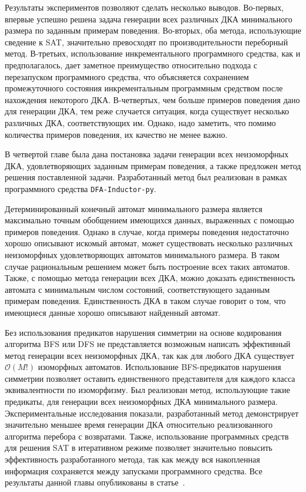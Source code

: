 Результаты экспериментов позволяют сделать несколько выводов.
Во-первых, впервые успешно решена задача генерации всех различных ДКА минимального размера по заданным примерам поведения.
Во-вторых, оба метода, использующие сведение к SAT, значительно превосходят по производительности переборный метод.
В-третьих, использование инкрементального программного средства, как и предполагалось, дает заметное преимущество относительно подхода с перезапуском программного средства, что объясняется сохранением промежуточного состояния инкрементальным программным средством после нахождения некоторого ДКА.
В-четвертых, чем больше примеров поведения дано для генерации ДКА, тем реже случается ситуация, когда существует несколько различных ДКА, соответствующих им.
Однако, надо заметить, что помимо количества примеров поведения, их качество не менее важно.



\chresults{\ref{sec:findall}}

В четвертой главе была дана постановка задачи генерации всех неизоморфных ДКА, удовлетворяющих заданным примерам поведения, а также предложен метод решения поставленной задачи.
Разработанный метод был реализован в рамках программного средства \texttt{DFA-Inductor-py}.

Детерминированный конечный автомат минимального размера является максимально точным обобщением имеющихся данных, выраженных с помощью примеров поведения.
Однако в случае, когда примеры поведения недостаточно хорошо описывают искомый автомат, может существовать несколько различных неизоморфных удовлетворяющих автоматов минимального размера.
В таком случае рациональным решением может быть построение всех таких автоматов.
Также, с помощью метода генерации всех ДКА, можно доказать единственность автомата с минимальным числом состояний, соответствующего заданным примерам поведения.
Единственность ДКА в таком случае говорит о том, что имеющиеся данные хорошо описывают найденный автомат.

Без использования предикатов нарушения симметрии на основе кодирования алгоритма BFS или DFS не представляется возможным написать эффективный метод генерации всех неизоморфных ДКА, так как для любого ДКА существует $\mathcal{O}\left(M!\right)$ изоморфных автоматов.
Использование BFS-предикатов нарушения симметрии позволяет оставить единственного представителя для каждого класса эквивалентности по изоморфизму.
Был реализован метод, использующие такие предикаты, для генерации всех неизоморфных ДКА минимального размера.
Экспериментальные исследования показали, разработанный метод демонстрирует значительно меньшее время генерации ДКА относительно реализованного алгоритма перебора с возвратами.
Также, использование программных средств для решения SAT в итеративном режиме позволяет значительно повысить эффективность разработанного метода, так как между вся накопленная информация сохраняется между запусками программного средства.
Все результаты данной главы опубликованы в статье~\cite{zakirzyanov2017DataMode}.


